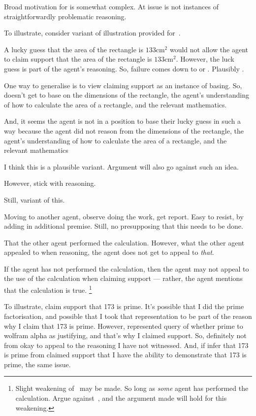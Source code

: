 \begin{note}
  Broad motivation for \ESU{} is somewhat complex.
  At issue is not instances of straightforwardly problematic reasoning.

  To illustrate, consider variant of illustration provided for~\USE{}.

  A lucky guess that the area of the rectangle is \(133\text{cm}^{2}\) would not allow the agent to claim support that the area of the rectangle is \(133\text{cm}^{2}\).
  However, the luck guess is part of the agent's reasoning.
  So, failure comes down to \ideaCSA{} or \ideaCSB{}.
  Plausibly \ideaCSB{}.
\end{note}

\begin{note}[Illustration]
  One way to generalise is to view claiming support as an instance of basing.
  So, doesn't get to base on the dimensions of the rectangle, the agent's understanding of how to calculate the area of a rectangle, and the relevant mathematics.

  And, it seems the agent is not in a position to base their lucky guess in such a way because the agent did not reason from the dimensions of the rectangle, the agent's understanding of how to calculate the area of a rectangle, and the relevant mathematics

  I think this is a plausible variant.
  Argument will also go against such an idea.

  However, stick with reasoning.

  Still, variant of this.

  Moving to another agent, observe doing the work, get report.
  Easy to resist, by adding in additional premise.
  Still, no presupposing that this needs to be done.

  That the other agent performed the calculation.
  However, what the other agent appealed to when reasoning, the agent does not get to appeal to \emph{that}.

  If the agent has not performed the calculation, then the agent may not appeal to the use of the calculation when claiming support --- rather, the agent mentions that the calculation is true.\nolinebreak
  \footnote{
    Slight weakening of~\ESU{} may be made.
    So long as \emph{some} agent has performed the calculation.
    Argue against~\ESU{}, and the argument made will hold for this weakening.
  }
\end{note}

\begin{note}
  To illustrate, claim support that 173 is prime.
  It's possible that I did the prime factorisation, and possible that I took that representation to be part of the reason why I claim that 173 is prime.
  However, represented query of whether prime to wolfram alpha as justifying, and that's why I claimed support.
  So, definitely not from okay to appeal to the reasoning I have not witnessed.
  And, if infer that 173 is prime from claimed support that I have the ability to demonstrate that 173 is prime, the same issue.
\end{note}

